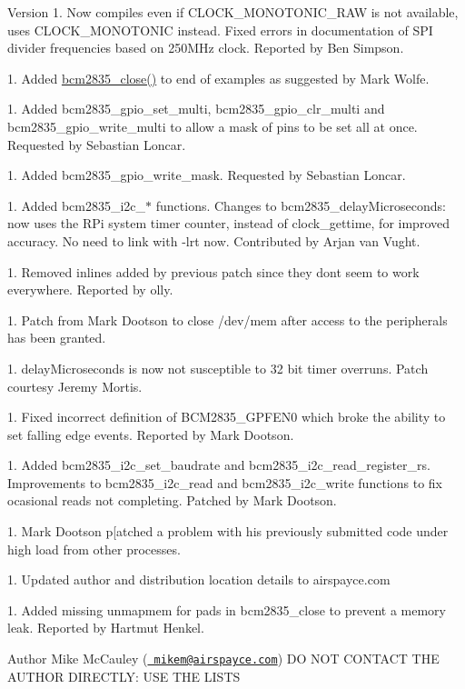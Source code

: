 \begin{DoxyVersion}{Version}
1. Now compiles even if CLOCK\+\_\+\+MONOTONIC\+\_\+\+RAW is not available, uses CLOCK\+\_\+\+MONOTONIC instead. Fixed errors in documentation of SPI divider frequencies based on 250MHz clock. Reported by Ben Simpson. 

1. Added \mbox{\hyperlink{group__init_ga3a42892f61764132d106a4ae32271002}{bcm2835\+\_\+close()}} to end of examples as suggested by Mark Wolfe. 

1. Added bcm2835\+\_\+gpio\+\_\+set\+\_\+multi, bcm2835\+\_\+gpio\+\_\+clr\+\_\+multi and bcm2835\+\_\+gpio\+\_\+write\+\_\+multi to allow a mask of pins to be set all at once. Requested by Sebastian Loncar. 

1. Added bcm2835\+\_\+gpio\+\_\+write\+\_\+mask. Requested by Sebastian Loncar. 

1. Added bcm2835\+\_\+i2c\+\_\+$\ast$ functions. Changes to bcm2835\+\_\+delay\+Microseconds\+: now uses the RPi system timer counter, instead of clock\+\_\+gettime, for improved accuracy. No need to link with -\/lrt now. Contributed by Arjan van Vught. 

1. Removed inlines added by previous patch since they don\textquotesingle{}t seem to work everywhere. Reported by olly. 

1. Patch from Mark Dootson to close /dev/mem after access to the peripherals has been granted. 

1. delay\+Microseconds is now not susceptible to 32 bit timer overruns. Patch courtesy Jeremy Mortis. 

1. Fixed incorrect definition of BCM2835\+\_\+\+GPFEN0 which broke the ability to set falling edge events. Reported by Mark Dootson. 

1. Added bcm2835\+\_\+i2c\+\_\+set\+\_\+baudrate and bcm2835\+\_\+i2c\+\_\+read\+\_\+register\+\_\+rs. Improvements to bcm2835\+\_\+i2c\+\_\+read and bcm2835\+\_\+i2c\+\_\+write functions to fix ocasional reads not completing. Patched by Mark Dootson. 

1. Mark Dootson p\mbox{[}atched a problem with his previously submitted code under high load from other processes. 

1. Updated author and distribution location details to airspayce.\+com 

1. Added missing unmapmem for pads in bcm2835\+\_\+close to prevent a memory leak. Reported by Hartmut Henkel. 
\end{DoxyVersion}
\begin{DoxyAuthor}{Author}
Mike Mc\+Cauley (\href{mailto:mikem@airspayce.com}{\texttt{ mikem@airspayce.\+com}}) DO NOT CONTACT THE AUTHOR DIRECTLY\+: USE THE LISTS 
\end{DoxyAuthor}

